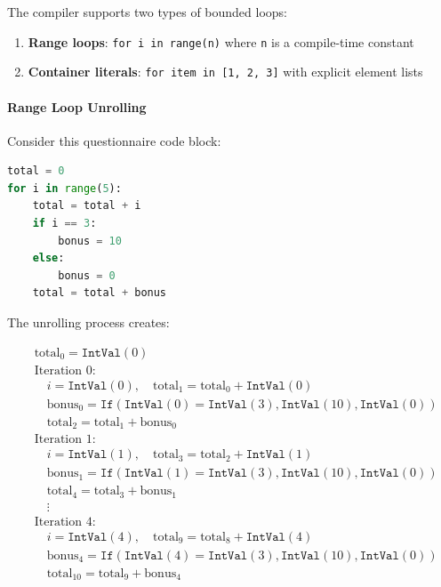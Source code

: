 The compiler supports two types of bounded loops:

\begin{enumerate}
    \item \textbf{Range loops}: \texttt{for i in range(n)} where \texttt{n} is a compile-time constant
    \item \textbf{Container literals}: \texttt{for item in [1, 2, 3]} with explicit element lists
\end{enumerate}

\paragraph{Range Loop Unrolling}

Consider this questionnaire code block:

\begin{lstlisting}[language=Python, numbers=none, caption={Python for loop with range}]
total = 0
for i in range(5):
    total = total + i
    if i == 3:
        bonus = 10
    else:
        bonus = 0
    total = total + bonus
\end{lstlisting}

The unrolling process creates:

\begin{align*}
& \text{total}_0 = \texttt{IntVal}(0) \\
& \text{Iteration 0:} \\
& \quad i = \texttt{IntVal}(0), \quad \text{total}_1 = \text{total}_0 + \texttt{IntVal}(0) \\
& \quad \text{bonus}_0 = \texttt{If}(\texttt{IntVal}(0) = \texttt{IntVal}(3), \texttt{IntVal}(10), \texttt{IntVal}(0)) \\
& \quad \text{total}_2 = \text{total}_1 + \text{bonus}_0 \\
& \text{Iteration 1:} \\
& \quad i = \texttt{IntVal}(1), \quad \text{total}_3 = \text{total}_2 + \texttt{IntVal}(1) \\
& \quad \text{bonus}_1 = \texttt{If}(\texttt{IntVal}(1) = \texttt{IntVal}(3), \texttt{IntVal}(10), \texttt{IntVal}(0)) \\
& \quad \text{total}_4 = \text{total}_3 + \text{bonus}_1 \\
& \quad \vdots \\
& \text{Iteration 4:} \\
& \quad i = \texttt{IntVal}(4), \quad \text{total}_9 = \text{total}_8 + \texttt{IntVal}(4) \\
& \quad \text{bonus}_4 = \texttt{If}(\texttt{IntVal}(4) = \texttt{IntVal}(3), \texttt{IntVal}(10), \texttt{IntVal}(0)) \\
& \quad \text{total}_{10} = \text{total}_9 + \text{bonus}_4
\end{align*}

